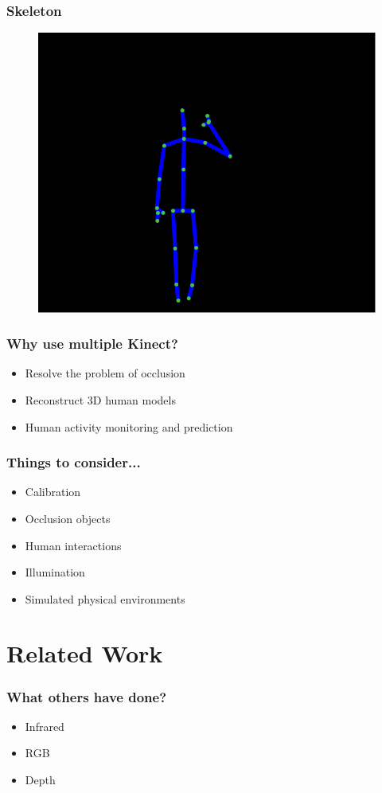 \documentclass{beamer}
\begin{document}
\begin{frame}
\frametitle{Skeleton}
\begin{figure}
\includegraphics[width=0.7\linewidth]{skeleton}
\end{figure}
\end{frame}

\begin{frame}
\frametitle{Why use multiple Kinect?}
\begin{itemize}
	\item Resolve the problem of occlusion
	\item Reconstruct 3D human models
	\item Human activity monitoring and prediction
\end{itemize}
\end{frame}

\begin{frame}
\frametitle{Things to consider...}
\begin{itemize}
	\item Calibration
	\item Occlusion objects
	\item Human interactions
	\item Illumination
	\item Simulated physical environments
\end{itemize}
\end{frame}

\section{Related Work}

\begin{frame}
\frametitle{What others have done?}
\begin{itemize}
	\item Infrared
	\item RGB
	\item Depth
\end{itemize}
\end{frame}
\end{document}
